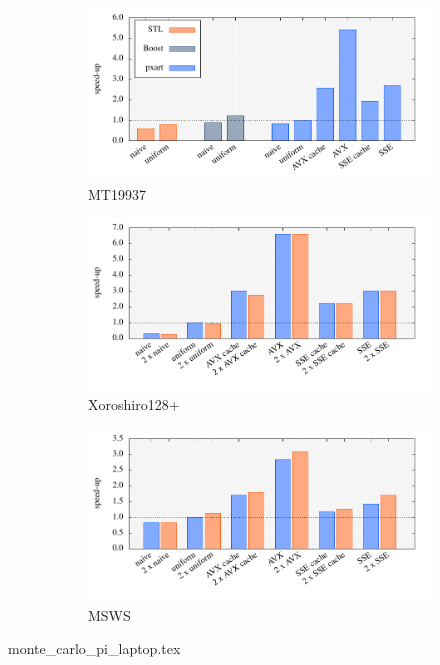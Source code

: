 \documentclass{stdlocal}
\begin{document}
  \begin{figure}
    \center
    \begin{subfigure}[b]{\textwidth}
      \includegraphics[width=\textwidth]{plots/monte_carlo_pi_laptop_mt19937.pdf}
      \caption{MT19937}
    \end{subfigure}

    \begin{subfigure}[b]{\textwidth}
      \includegraphics[width=\textwidth]{plots/monte_carlo_pi_laptop_xrsr128p.pdf}
      \caption{Xoroshiro128+}
    \end{subfigure}

    \begin{subfigure}[b]{\textwidth}
      \includegraphics[width=\textwidth]{plots/monte_carlo_pi_laptop_msws.pdf}
      \caption{MSWS}
    \end{subfigure}
    \caption{}
  \end{figure}

  \begin{table}
    \center
    \caption{}
    \footnotesize
    \renewcommand{\arraystretch}{1.2}
    {monte_carlo_pi_laptop.tex}
  \end{table}
\end{document}

